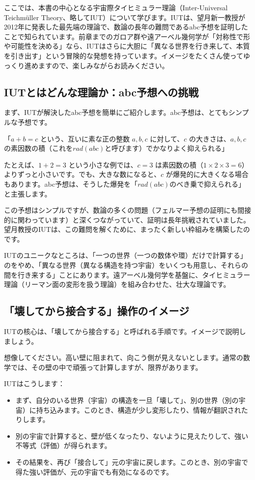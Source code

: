 \documentclass[dvipdfmx,12pt,a4paper]{jsarticle}
\begin{document}
ここでは、本書の中心となる宇宙際タイヒミュラー理論（Inter-Universal Teichmüller Theory、略してIUT）について学びます。IUTは、望月新一教授が2012年に発表した最先端の理論で、数論の長年の難問であるabc予想を証明したことで知られています。前章までのガロア群や遠アーベル幾何学が「対称性で形や可能性を決める」なら、IUTはさらに大胆に「異なる世界を行き来して、本質を引き出す」という冒険的な発想を持っています。イメージをたくさん使ってゆっくり進めますので、楽しみながらお読みください。

\subsection{IUTとはどんな理論か：abc予想への挑戦}

まず、IUTが解決したabc予想を簡単にご紹介します。abc予想は、とてもシンプルな予想です。

「$a + b = c$ という、互いに素な正の整数 $a, b, c$ に対して、$c$ の大きさは、$a, b, c$ の素因数の積（これを$rad(abc)$と呼びます）でかなりよく抑えられる」

たとえば、$1 + 2 = 3$ という小さな例では、$c=3$ は素因数の積（$1 \times 2 \times 3 = 6$）よりずっと小さいです。でも、大きな数になると、$c$ が爆発的に大きくなる場合もあります。abc予想は、そうした爆発を「$rad(abc)$のべき乗で抑えられる」と主張します。

この予想はシンプルですが、数論の多くの問題（フェルマー予想の証明にも間接的に関わっています）と深くつながっていて、証明は長年挑戦されていました。望月教授のIUTは、この難問を解くために、まったく新しい枠組みを構築したのです。

IUTのユニークなところは、「一つの世界（一つの数体や環）だけで計算する」のをやめ、「異なる世界（異なる構造を持つ宇宙）をいくつも用意し、それらの間を行き来する」ことにあります。遠アーベル幾何学を基盤に、タイヒミュラー理論（リーマン面の変形を扱う理論）を組み合わせた、壮大な理論です。

\subsection{「壊してから接合する」操作のイメージ}

IUTの核心は、「壊してから接合する」と呼ばれる手順です。イメージで説明しましょう。

想像してください。高い壁に阻まれて、向こう側が見えないとします。通常の数学では、その壁の中で頑張って計算しますが、限界があります。

IUTはこうします：
\begin{itemize}
  \item まず、自分のいる世界（宇宙）の構造を一旦「壊して」、別の世界（別の宇宙）に持ち込みます。このとき、構造が少し変形したり、情報が翻訳されたりします。
  \item 別の宇宙で計算すると、壁が低くなったり、ないように見えたりして、強い不等式（評価）が得られます。
  \item その結果を、再び「接合して」元の宇宙に戻します。このとき、別の宇宙で得た強い評価が、元の宇宙でも有効になるのです。
\end{itemize}
\end{document}
